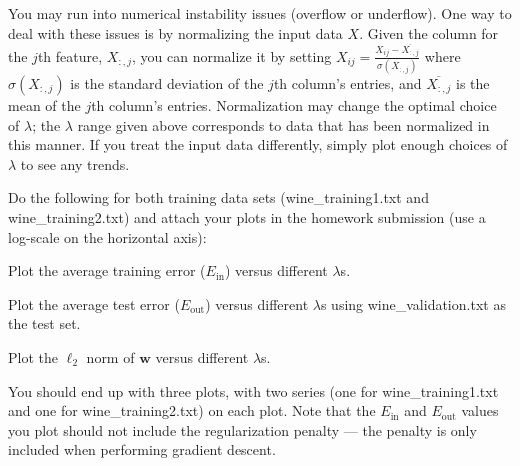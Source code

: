 You may run into numerical instability issues (overflow or underflow). One way to deal with these issues is by normalizing the input data $X$. Given the column for the $j$th feature, $X_{:,j}$, you can normalize it by setting $X_{ij} = \frac{X_{ij} - \overline{X_{:,j}} }{\sigma(X_{:,j})}$ where $\sigma(X_{:,j})$ is the standard deviation of the $j$th column's entries, and $\overline{X_{:,j}}$ is the mean of the $j$th column's entries. Normalization may change the optimal choice of $\lambda$; the $\lambda$ range given above corresponds to data that has been normalized in this manner. If you treat the input data differently, simply plot enough choices of $\lambda$ to see any trends.

\problem[16]
Do the following for both training data sets (wine\_training1.txt and wine\_training2.txt) and attach your plots in the homework submission (use a log-scale on the horizontal axis):

\subproblem Plot the average training error ($E_\text{in}$) versus different $\lambda$s.

\subproblem Plot the average test error ($E_\text{out}$) versus different $\lambda$s using wine\_validation.txt as the test set.

\subproblem Plot the $\ell_2$ norm of $\mathbf{w}$ versus different $\lambda$s. \medskip

 You should end up with three plots, with two series (one for wine\_training1.txt and one for wine\_training2.txt) on each plot. Note that the $E_\text{in}$ and $E_\text{out}$ values you plot should not include the regularization penalty --- the penalty is only included when performing gradient descent.

